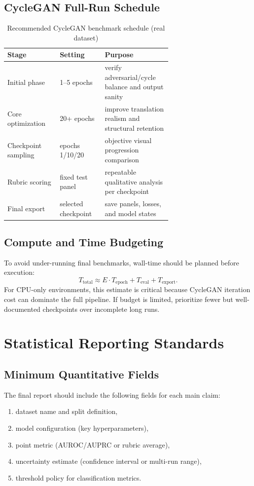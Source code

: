 \documentclass[conference]{IEEEtran}
\begin{document}
\subsection{CycleGAN Full-Run Schedule}
\begin{table}[!t]
\centering
\small
\caption{Recommended CycleGAN benchmark schedule (real dataset)}
\begin{tabular}{|p{0.22\linewidth}|p{0.18\linewidth}|p{0.26\linewidth}|}
\hline
\textbf{Stage} & \textbf{Setting} & \textbf{Purpose} \\
\hline
Initial phase & 1--5 epochs & verify adversarial/cycle balance and output sanity \\
\hline
Core optimization & 20+ epochs & improve translation realism and structural retention \\
\hline
Checkpoint sampling & epochs 1/10/20 & objective visual progression comparison \\
\hline
Rubric scoring & fixed test panel & repeatable qualitative analysis per checkpoint \\
\hline
Final export & selected checkpoint & save panels, losses, and model states \\
\hline
\end{tabular}
\end{table}

\subsection{Compute and Time Budgeting}
To avoid under-running final benchmarks, wall-time should be planned before execution:
\begin{equation}
T_{\text{total}} \approx E \cdot T_{\text{epoch}} + T_{\text{eval}} + T_{\text{export}}.
\end{equation}
For CPU-only environments, this estimate is critical because CycleGAN iteration cost can dominate the full pipeline. If budget is limited, prioritize fewer but well-documented checkpoints over incomplete long runs.

\section{Statistical Reporting Standards}
\subsection{Minimum Quantitative Fields}
The final report should include the following fields for each main claim:
\begin{enumerate}
\item dataset name and split definition,
\item model configuration (key hyperparameters),
\item point metric (AUROC/AUPRC or rubric average),
\item uncertainty estimate (confidence interval or multi-run range),
\item threshold policy for classification metrics.
\end{enumerate}
\end{document}
